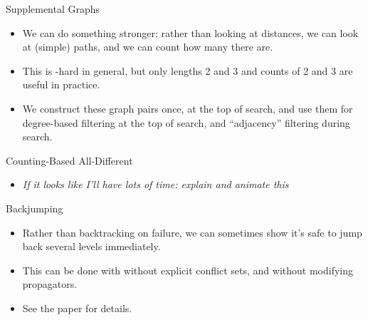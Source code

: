 \documentclass{beamer}
\begin{document}
\begin{frame}{Supplemental Graphs}
{
        \vspace{1em}
    }

     {
        \begin{itemize}
            \item We can do something stronger: rather than looking at distances, we can look at
                (simple) paths, and we can count how many there are.

            \item This is \NP-hard in general, but only lengths 2 and 3 and counts of 2 and 3 are
                useful in practice.

            \item We construct these graph pairs once, at the top of search, and use them for
                degree-based filtering at the top of search, and ``adjacency'' filtering during
                search.
        \end{itemize}
    }
\end{frame}

\begin{frame}{Counting-Based All-Different}
    \begin{itemize}
        \item \emph{If it looks like I'll have lots of time: explain and animate this}
    \end{itemize}
\end{frame}

\begin{frame}{Backjumping}
    \begin{itemize}
        \item Rather than backtracking on failure, we can sometimes show it's safe to jump back
            several levels immediately.
        \item This can be done with without explicit conflict sets, and without modifying
            propagators.
        \item See the paper for details.
    \end{itemize}
\end{frame}
\end{document}
